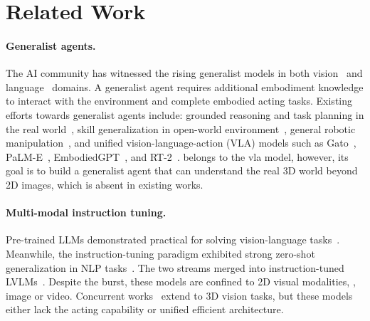 \section{Related Work}\label{app:sec:related}

\paragraph{Generalist agents.} The AI community has witnessed the rising generalist models in both vision~\citep{lu2023unified,wang2023images,kirillov2023segment} and language~\citep{openai2022chatgpt,openai2023gpt4} domains. A generalist agent requires additional embodiment knowledge to interact with the environment and complete embodied acting tasks. Existing efforts towards generalist agents include: grounded reasoning and task planning in the real world~\citep{ahn2022can,huang2022inner}, skill generalization in open-world environment~\citep{fan2022minedojo,cai2023open,wang2023describe,wang2023voyager,cai2023groot,jxma_llm_vla_vlm_mas_multiagent_2023}, general robotic manipulation~\citep{brohan2022rt,jiang2023vima,gong2023arnold}, and unified vision-language-action (VLA) models such as Gato~\citep{reed2022generalist}, PaLM-E~\citep{driess2023palm}, EmbodiedGPT~\citep{mu2023embodiedgpt}, and RT-2~\citep{brohan2023rt}. \agent belongs to the \ac{vla} model, however, its goal is to build a generalist agent that can understand the real 3D world beyond 2D images, which is absent in existing works.

\paragraph{Multi-modal instruction tuning.} Pre-trained LLMs demonstrated practical for solving vision-language tasks~\citep{tsimpoukelli2021multimodal,alayrac2022flamingo,guo2023images,li2023blip,jxma_vlm_multimodal_2023}. Meanwhile, the instruction-tuning paradigm exhibited strong zero-shot generalization in NLP tasks~\citep{wei2022finetuned,sanh2022multitask,ouyang2022training,chung2022scaling}. The two streams merged into instruction-tuned LVLMs~\citep{liu2023visual,zhu2023minigpt,ye2023mplug,gao2023llama,li2023otter,gong2023multimodal,dai2023instructblip}. Despite the burst, these models are confined to 2D visual modalities, \eg, image or video. Concurrent works~\citep{yin2023lamm,hong20233d,wang2023chat,xu2023pointllm} extend to 3D vision tasks, but these models either lack the acting capability or unified efficient architecture.

